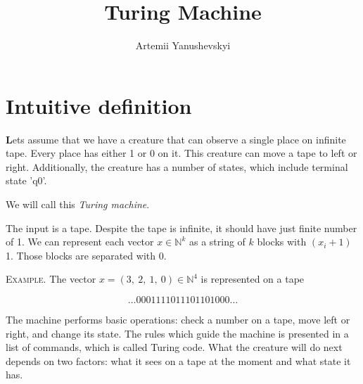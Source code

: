 \documentclass[12pt]{article}
\title{Turing Machine}
\author{Artemii Yanushevskyi}
\date{}
\newcommand\tab[1][-1em]{\hspace*{#1}}
\begin{document}
\maketitle

\begin{addmargin}[3em]{3em}
\end{addmargin}

\section{Intuitive definition}
\textbf{\large L}ets assume that we have a creature that can observe a single place on infinite tape. Every place has either 1 or 0 on it. This creature can move a tape to left or right. Additionally, the creature has a number of states, which include terminal state '$\mathrm{q}0$'.

We will call this \emph{Turing machine}.

The input is a tape. Despite the tape is infinite, it should have just finite number of 1.
We can represent each vector $x\in\mathbb{N}^k$ as a string of $k$ blocks with $(x_i+1)$ 1. Those blocks are separated with 0. 

 \vspace{5mm}
\begin{addmargin}[3em]{3em}
\tab
\textsc{Example.} The vector $x=(3,\ 2,\ 1,\ 0)\in\mathbb{N}^4$ is represented on a tape

{\large $$\dots 0001111011101101000\dots$$}

\end{addmargin}

The machine performs basic operations: check a number on a tape, move left or right, and change its state. The rules which guide the machine is presented in a list of commands, which is called Turing code. What the creature will do next depends on two factors: what it sees on a tape at the moment and what state it has.
 
\end{document}

